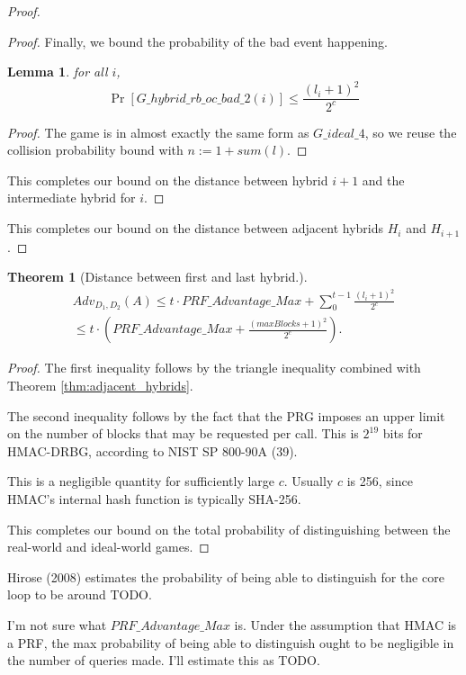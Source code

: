 \documentclass[12pt,lot, lof]{puthesis}
\newcommand{\f}{\frac}
\newtheorem{thm}{Theorem}
\newtheorem{lem}{Lemma}[thm]
\begin{document}
{\begin{proof}
\begin{proof}
Finally, we bound the probability of the bad event happening.

\begin{lem} for all $i$,
$$\Pr[G\_hybrid\_rb\_oc\_bad\_2(i)] \leq \f{(l_i+1)^2}{2^c}$$ \end{lem}
\begin{proof} 
The game is in almost exactly the same form as $G\_ideal\_4$, so we reuse the collision probability bound with $n := 1 + sum(l)$.
\end{proof}

This completes our bound on the distance between hybrid $i+1$ and the intermediate hybrid for $i$.
\end{proof}

This completes our bound on the distance between adjacent hybrids $H_i$ and $H_{i+1}$.

\end{proof}

\begin{thm}[Distance between first and last hybrid.] \label{thm:hybrids}
\begin{gather*}
Adv_{D_1, D_2}(A) \leq t \cdot PRF\_Advantage\_Max + \sum_{0}^{t-1} \f{(l_i+1)^2}{2^c} \\ 
\leq t \cdot (PRF\_Advantage\_Max + \f{(maxBlocks + 1)^2}{2^c}).
\end{gather*}
\end{thm}
\begin{proof}
The first inequality follows by the triangle inequality combined with Theorem \ref{thm:adjacent_hybrids}. 

The second inequality follows by the fact that the PRG imposes an upper limit on the number of blocks that may be requested per call. This is $2^{19}$ bits for HMAC-DRBG, according to NIST SP 800-90A (39).

This is a negligible quantity for sufficiently large $c$. Usually $c$ is 256, since HMAC's internal hash function is typically SHA-256.

This completes our bound on the total probability of distinguishing between the real-world and ideal-world games.
\end{proof}

Hirose (2008) estimates the probability of being able to distinguish for the core loop to be around TODO.

I'm not sure what $PRF\_Advantage\_Max$ is. Under the assumption that HMAC is a PRF, the max probability of being able to distinguish ought to be negligible in the number of queries made. I'll estimate this as TODO.

}
\end{document}
